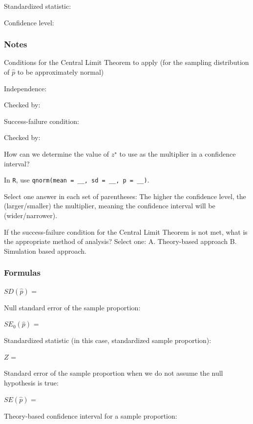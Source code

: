 \documentclass[
]{report}
\newcommand{\rgs}{\vspace{12pt}} %
\newcommand{\rgi}{\hspace{24pt}}  %
\begin{document}
Standardized statistic:
\rgs

Confidence level:
\rgs

\hypertarget{notes-18}{%
\subsubsection*{Notes}\label{notes-18}}

Conditions for the Central Limit Theorem to apply (for the sampling distribution of \(\hat{p}\) to be approximately normal)

\rgi Independence:
\rgs

\rgi \rgi Checked by:
\rgs

\rgi Success-failure condition:
\rgs

\rgi \rgi Checked by:
\rgs

How can we determine the value of \(z^⋆\) to use as the multiplier in a confidence interval?
\rgs

\rgi In \texttt{R}, use \texttt{qnorm(mean\ =\ \_\_,\ sd\ =\ \_\_,\ p\ =\ \_\_)}.

Select one answer in each set of parentheses: The higher the confidence level, the (larger/smaller) the multiplier, meaning the confidence interval will be (wider/narrower).

If the success-failure condition for the Central Limit Theorem is not met, what is the appropriate method of analysis? Select one:
\rgi A. Theory-based approach
\rgi B. Simulation based approach.

\hypertarget{formulas-2}{%
\subsubsection*{Formulas}\label{formulas-2}}

\(SD(\hat{p})\) =
\rgs

Null standard error of the sample proportion:

\(SE_0(\hat{p})\) =
\rgs

Standardized statistic (in this case, standardized sample proportion):

\(Z\) =
\rgs

Standard error of the sample proportion when we do not assume the null hypothesis is true:

\(SE(\hat{p})\) =
\rgs

Theory-based confidence interval for a sample proportion:
\rgs
\end{document}
